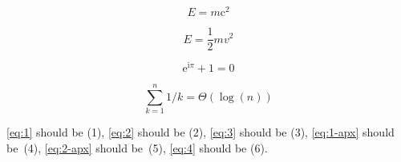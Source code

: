 \documentclass[12pt]{article}
\begin{document}
\begin{thmrep}
  \begin{equation}
    \label{eq:1}
    E=m\mathrm{c}^2
  \end{equation}
\end{thmrep}

\begin{thmrep}
  \begin{equation}
    \label{eq:2}
    E=\frac 1 2 mv^2
  \end{equation}
\end{thmrep}

\begin{equation}
  \mathrm{e}^{\mathrm{i}\pi}+1=0 \label{eq:3}
\end{equation}
  
\begin{toappendix}
  \begin{equation}
    \sum_{k=1}^{n} 1/k=\Theta(\log(n))\label{eq:4}
  \end{equation}

  \eqref{eq:1} should be (1), \eqref{eq:2} should be (2), \eqref{eq:3}
  should be (3), \eqref{eq:1-apx} should be~(4), \eqref{eq:2-apx} should
  be~(5), \eqref{eq:4} should be (6).
\end{toappendix}                  
\end{document}
